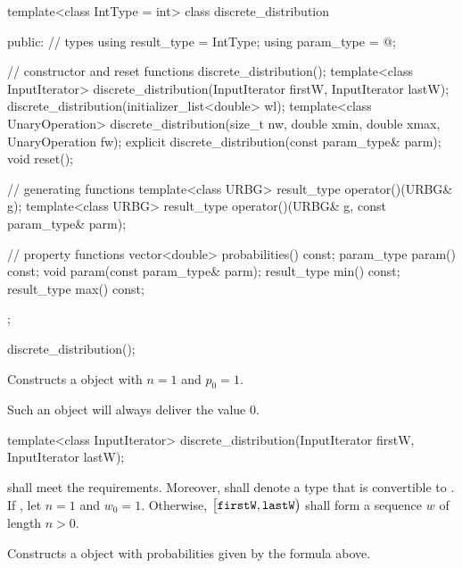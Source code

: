 %
\begin{codeblock}
template<class IntType = int>
  class discrete_distribution {
  public:
    // types
    using result_type = IntType;
    using param_type  = @\unspec@;

    // constructor and reset functions
    discrete_distribution();
    template<class InputIterator>
      discrete_distribution(InputIterator firstW, InputIterator lastW);
    discrete_distribution(initializer_list<double> wl);
    template<class UnaryOperation>
      discrete_distribution(size_t nw, double xmin, double xmax, UnaryOperation fw);
    explicit discrete_distribution(const param_type& parm);
    void reset();

    // generating functions
    template<class URBG>
      result_type operator()(URBG& g);
    template<class URBG>
      result_type operator()(URBG& g, const param_type& parm);

    // property functions
    vector<double> probabilities() const;
    param_type param() const;
    void param(const param_type& parm);
    result_type min() const;
    result_type max() const;
  };
\end{codeblock}

\begin{itemdecl}
discrete_distribution();
\end{itemdecl}

\begin{itemdescr}
\pnum\effects Constructs a  object
with $n = 1$ and $p_0 = 1$.
\begin{note}
Such an object will always deliver the value $0$.
\end{note}
\end{itemdescr}


%
\begin{itemdecl}
template<class InputIterator>
  discrete_distribution(InputIterator firstW, InputIterator lastW);
\end{itemdecl}

\begin{itemdescr}
\pnum
\requires
   shall meet the
   requirements.
  Moreover,
  shall denote a type that is convertible to .
 If ,
 let $n = 1$ and $w_0 = 1$.
 Otherwise,
 $\bigl[\texttt{firstW}, \texttt{lastW}\bigr)$
 shall form a sequence $w$ of length $n > 0$.

\pnum
\effects Constructs a  object
with probabilities given by the formula above.
\end{itemdescr}


